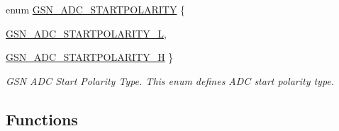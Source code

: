 \begin{DoxyCompactItemize}
enum \hyperlink{a00643_ga022c151fd88b9ea5c11ad9fbfb415a18}{GSN\_\-ADC\_\-STARTPOLARITY} \{ \par
\hyperlink{a00643_gga022c151fd88b9ea5c11ad9fbfb415a18a2a1cdbf6fdf55211555c08781bc4cf10}{GSN\_\-ADC\_\-STARTPOLARITY\_\-L}, 
\par
\hyperlink{a00643_gga022c151fd88b9ea5c11ad9fbfb415a18a01cee9ab8e124df14e2f98208e763730}{GSN\_\-ADC\_\-STARTPOLARITY\_\-H}
 \}
\begin{DoxyCompactList}\small\item\em GSN ADC Start Polarity Type. This enum defines ADC start polarity type. \end{DoxyCompactList}\end{DoxyCompactItemize}
\subsection*{Functions}
